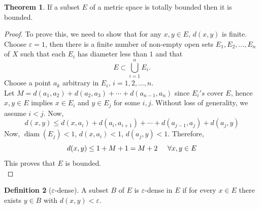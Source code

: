 \documentclass[11pt,a4paper]{article}
\theoremstyle{definition}
\newtheorem{thm}{Theorem}[section]
\newtheorem{defn}[thm]{Definition}
\DeclareMathOperator{\diam}{diam}
\begin{document}
\begin{thm}
If a subset $E$ of a metric space is totally bounded then it is bounded.

\end{thm}

\begin{proof}
To prove this, we need to show that for any $x,y\in E$, $d(x,y)$ is finite. Choose $\varepsilon =1$, then there is a finite number of non-empty open sets $E_1,E_2,\dots,E_n$ of $X$ such that each $E_i$ has diameter less than $1$ and that $$E\subset \bigcup^n_{i=1}E_i.$$ Choose a point $a_k$ arbitrary in $E_i$,  $i=1,2,\dots,n$.\\ 
Let $M=d(a_1,a_2)+d(a_2,a_3)+\cdots+d(a_{n-1},a_n)$ since $E_i's$ cover $E$, hence $x,y\in E$ implies $x\in E_i$ and $y\in E_j$ for some $i,j$. Without loss of generality, we assume $i<j$. Now, $$d(x,y)\leq d(x,a_i)+d(a_i,a_{i+1})+\cdots+d(a_{j-1},a_j)+d(a_j,y)$$ Now, $\diam(E_j)<1$,\hspace{0.3cm} $d(x,a_i)<1$,\hspace{0.3cm} $d(a_j,y)<1$.\hspace{0.2cm} 
Therefore, $$d(x,y)\leq 1+M+1=M+2\hspace{0.5cm} \forall x,y\in E$$ This proves that $E$ is bounded.\\

\end{proof}


\begin{defn}[$\varepsilon$-dense]
A subset $B$ of $E$ is $\varepsilon$-dense in $E$ if for every $x\in E$ there
exists $y\in B$ with $d(x,y)<\varepsilon$.
\end{defn}
\end{document}
